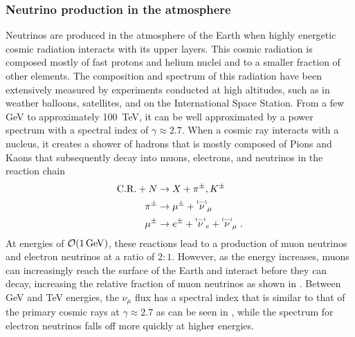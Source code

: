 \subsubsection{Neutrino production in the atmosphere}
Neutrinos are produced in the atmosphere of the Earth when highly energetic cosmic radiation interacts with its upper layers.
This cosmic radiation is composed mostly of fast protons and helium nuclei and to a smaller fraction of other elements.
The composition and spectrum of this radiation have been extensively measured by experiments conducted at high altitudes, such as in weather balloons, satellites, and on the International Space Station.
From a few GeV to approximately \SI{100}{TeV}, it can be well approximated by a power spectrum with a spectral index of $\gamma \approx 2.7$.
When a cosmic ray interacts with a nucleus, it creates a shower of hadrons that is mostly composed of Pions and Kaons that subsequently decay into muons, electrons, and neutrinos in the reaction chain
\begin{equation}
    \begin{aligned}
        \mathrm{C.R.} + N & \rightarrow X + \pi^\pm, K^\pm \\
        \pi^\pm & \rightarrow \mu^\pm + \pbar{\nu}_\mu \\
        \mu^\pm & \rightarrow e^\pm + \pbar{\nu}_e + \pbar{\nu}_\mu\;.
    \end{aligned}
\end{equation}
At energies of $\order{\SI{1}{GeV}}$, these reactions lead to a production of muon neutrinos and electron neutrinos at a ratio of $2:1$.
However, as the energy increases, muons can increasingly reach the surface of the Earth and interact before they can decay, increasing the relative fraction of muon neutrinos as shown in .
Between GeV and TeV energies, the $\nu_\mu$ flux has a spectral index that is similar to that of the primary cosmic rays at $\gamma \approx 2.7$ as can be seen in , while the spectrum for electron neutrinos falls off more quickly at higher energies.
